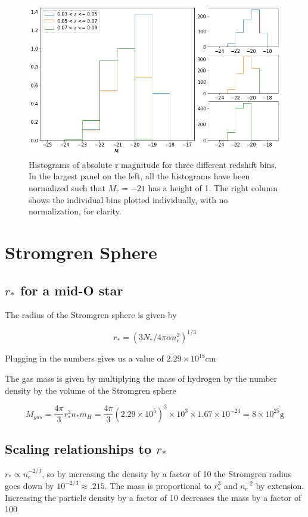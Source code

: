 \documentclass[12pt]{article}
\begin{document}
\begin{figure}
\centering
\includegraphics[width=5in]{redshifts.png}
\caption{Histograms of absolute r magnitude for three different redshift bins. In the largest panel on the left, all the histograms have been normalized such that $M_{r} = -21$ has a height of 1. The right column shows the individual bins plotted individually, with no normalization, for clarity.}
\end{figure}

\section{Stromgren Sphere}
\subsection{$r_*$ for a mid-O star}
The radius of the Stromgren sphere is given by

$$r_* = (3N_* / 4\pi \alpha n_e^2)^{1/3}$$

Plugging in the numbers gives us a value of $2.29 \times 10^{18} \mathrm{cm}$ 

The gas mass is given by multiplying the mass of hydrogen by the number density by the volume of the Stromgren sphere

$$M_{gas} = \frac{4\pi}{3} r_*^3 n_* m_{H}  = \frac{4\pi}{3} (2.29 \times 10^{5})^3 \times 10^3 \times 1.67 \times10^{-24} = 8 \times 10^{25} \mathrm{g}$$

\subsection{Scaling relationships to $r_*$}

$r_* \propto n_e^{-2/3}$, so by increasing the density by a factor of 10 the Stromgren radius goes down by $10^{-2/3} \approx .215$. The mass is proportional to $r_*^3$ and $n_e^{-2}$ by extension. Increasing the particle density by a factor of 10 decreases the mass by a factor of 100
\end{document}
